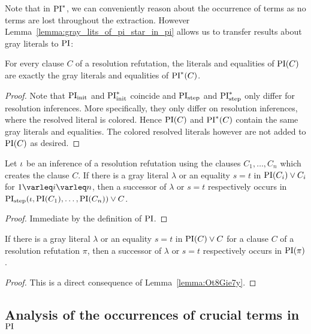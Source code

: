 Note that in $\operatorname{PI}^*$, we can conveniently reason about the occurrence of terms as no terms are lost throughout the extraction.
However Lemma~\ref{lemma:gray_lits_of_pi_star_in_pi} allows us to transfer results about gray literals to $\operatorname{PI}$:

\begin{lemma}
	\label{lemma:gray_lits_of_pi_star_in_pi}
	For every clause $C$ of a resolution refutation,
	the literals and equalities of $\operatorname{PI}(C)$ are exactly the gray literals and equalities of $\operatorname{PI}^*(C)$.
\end{lemma}
\begin{proof}
	Note that $\operatorname{PI}_{\mathrm{init}}$ and $\operatorname{PI}_{\mathrm{init}}^*$ coincide and $\operatorname{PI}_{\mathrm{step}}$ and $\operatorname{PI}_{\mathrm{step}}^*$ only differ for resolution inferences.
	More specifically, they only differ on resolution inferences, where the resolved literal is colored.
	Hence $\operatorname{PI}(C)$ and $\operatorname{PI}^*(C)$ contain the same gray literals and equalities.
	The colored resolved literals however are not added to $\operatorname{PI}(C)$ as desired.
\end{proof}


\begin{lemma}
	\label{lemma:Ot8Gie7y}
	Let $\iota$ be an inference of a resolution refutation using the clauses $C_1, \dots, C_n$ which creates the clause $C$.
	If there is a gray literal $\lambda$ or an equality $s=t$ in $\operatorname{PI}(C_i) \lor C_i$ for $1 \varleq i \varleq n$, 
	then a successor of $\lambda$ or $s=t$ respectively occurs in $\operatorname{PI}_{\mathrm{step}}(\iota, \operatorname{PI}(C_1), \dots, \operatorname{PI}(C_n)) \lor C$.
\end{lemma}
\begin{proof}
	Immediate by the definition of $\operatorname{PI}$.
\end{proof}

\begin{corr}
	\label{lemma:gray_lits_and_eq_all_in_PI}
	If there is a gray literal $\lambda$ or an equality $s=t$ in $\operatorname{PI}(C) \lor C$ for a clause $C$ of a resolution refutation $\pi$,
	then a successor of $\lambda$ or $s=t$ respectively occurs in $\operatorname{PI}(\pi)$.
\end{corr}
\begin{proof}
	This is a direct consequence of Lemma~\ref{lemma:Ot8Gie7y}.
\end{proof}


\subsection{Analysis of the occurrences of crucial terms in $\operatorname{PI}$}

